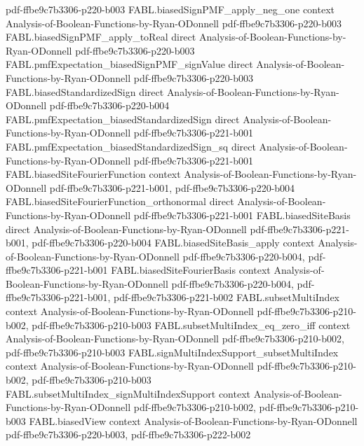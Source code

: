 \begin{theorem}
  {pdf-ffbe9c7b3306-p220-b003}
\proofstep
  {FABL.biasedSignPMF_apply_neg_one}
  {context}
  {Analysis-of-Boolean-Functions-by-Ryan-ODonnell}
  {pdf-ffbe9c7b3306-p220-b003}
\proofstep
  {FABL.biasedSignPMF_apply_toReal}
  {direct}
  {Analysis-of-Boolean-Functions-by-Ryan-ODonnell}
  {pdf-ffbe9c7b3306-p220-b003}
\proofstep
  {FABL.pmfExpectation_biasedSignPMF_signValue}
  {direct}
  {Analysis-of-Boolean-Functions-by-Ryan-ODonnell}
  {pdf-ffbe9c7b3306-p220-b003}
\proofstep
  {FABL.biasedStandardizedSign}
  {direct}
  {Analysis-of-Boolean-Functions-by-Ryan-ODonnell}
  {pdf-ffbe9c7b3306-p220-b004}
\proofstep
  {FABL.pmfExpectation_biasedStandardizedSign}
  {direct}
  {Analysis-of-Boolean-Functions-by-Ryan-ODonnell}
  {pdf-ffbe9c7b3306-p221-b001}
\proofstep
  {FABL.pmfExpectation_biasedStandardizedSign_sq}
  {direct}
  {Analysis-of-Boolean-Functions-by-Ryan-ODonnell}
  {pdf-ffbe9c7b3306-p221-b001}
\proofstep
  {FABL.biasedSiteFourierFunction}
  {context}
  {Analysis-of-Boolean-Functions-by-Ryan-ODonnell}
  {pdf-ffbe9c7b3306-p221-b001,
    pdf-ffbe9c7b3306-p220-b004}
\proofstep
  {FABL.biasedSiteFourierFunction_orthonormal}
  {direct}
  {Analysis-of-Boolean-Functions-by-Ryan-ODonnell}
  {pdf-ffbe9c7b3306-p221-b001}
\proofstep
  {FABL.biasedSiteBasis}
  {direct}
  {Analysis-of-Boolean-Functions-by-Ryan-ODonnell}
  {pdf-ffbe9c7b3306-p221-b001,
    pdf-ffbe9c7b3306-p220-b004}
\proofstep
  {FABL.biasedSiteBasis_apply}
  {context}
  {Analysis-of-Boolean-Functions-by-Ryan-ODonnell}
  {pdf-ffbe9c7b3306-p220-b004,
    pdf-ffbe9c7b3306-p221-b001}
\proofstep
  {FABL.biasedSiteFourierBasis}
  {context}
  {Analysis-of-Boolean-Functions-by-Ryan-ODonnell}
  {pdf-ffbe9c7b3306-p220-b004,
    pdf-ffbe9c7b3306-p221-b001,
    pdf-ffbe9c7b3306-p221-b002}
\proofstep
  {FABL.subsetMultiIndex}
  {context}
  {Analysis-of-Boolean-Functions-by-Ryan-ODonnell}
  {pdf-ffbe9c7b3306-p210-b002,
    pdf-ffbe9c7b3306-p210-b003}
\proofstep
  {FABL.subsetMultiIndex_eq_zero_iff}
  {context}
  {Analysis-of-Boolean-Functions-by-Ryan-ODonnell}
  {pdf-ffbe9c7b3306-p210-b002,
    pdf-ffbe9c7b3306-p210-b003}
\proofstep
  {FABL.signMultiIndexSupport_subsetMultiIndex}
  {context}
  {Analysis-of-Boolean-Functions-by-Ryan-ODonnell}
  {pdf-ffbe9c7b3306-p210-b002,
    pdf-ffbe9c7b3306-p210-b003}
\proofstep
  {FABL.subsetMultiIndex_signMultiIndexSupport}
  {context}
  {Analysis-of-Boolean-Functions-by-Ryan-ODonnell}
  {pdf-ffbe9c7b3306-p210-b002,
    pdf-ffbe9c7b3306-p210-b003}
\proofstep
  {FABL.biasedView}
  {context}
  {Analysis-of-Boolean-Functions-by-Ryan-ODonnell}
  {pdf-ffbe9c7b3306-p220-b003,
    pdf-ffbe9c7b3306-p222-b002}

\end{theorem}

